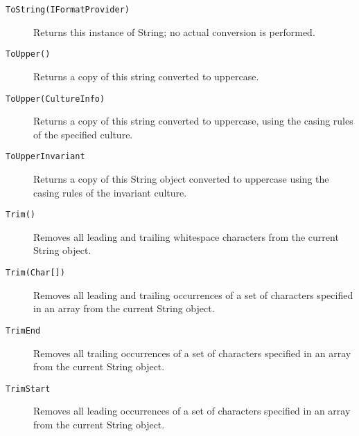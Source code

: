 \begin{description}
\item[\texttt{ToString(IFormatProvider)}] Returns this instance of String; no actual conversion is performed.
\item[\texttt{ToUpper()}] Returns a copy of this string converted to uppercase.
\item[\texttt{ToUpper(CultureInfo)}] Returns a copy of this string converted to uppercase, using the casing rules of the specified culture.
\item[\texttt{ToUpperInvariant}] Returns a copy of this String object converted to uppercase using the casing rules of the invariant culture.
\item[\texttt{Trim()}] Removes all leading and trailing whitespace characters from the current String object.
\item[\texttt{Trim(Char[])}] Removes all leading and trailing occurrences of a set of characters specified in an array from the current String object.
\item[\texttt{TrimEnd}] Removes all trailing occurrences of a set of characters specified in an array from the current String object.
\item[\texttt{TrimStart}] Removes all leading occurrences of a set of characters specified in an array from the current String object.
\end{description}



